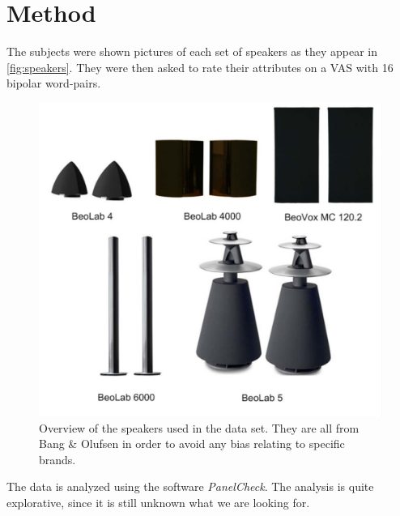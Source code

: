 \section*{Method}
\label{Method}
The subjects were shown pictures of each set of speakers as they appear in \autoref{fig:speakers}. They were then asked to rate their attributes on a VAS with 16 bipolar word-pairs. 
%
\begin{figure}[H]
\centering
\includegraphics[scale = 0.7]{Figure/speakers.png}
\caption{Overview of the speakers used in the data set. They are all from Bang \& Olufsen in order to avoid any bias relating to specific brands.}
\label{fig:speakers}
\end{figure}
\noindent
%
The data is analyzed using the software \textit{PanelCheck}. The analysis is quite explorative, since it is still unknown what we are looking for. 

